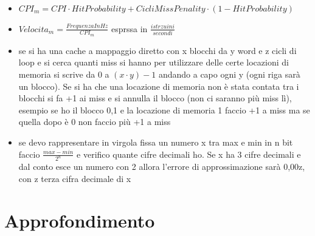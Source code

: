 \documentclass[a4paper,12pt, oneside]{book}
\begin{document}
\begin{itemize}
	\item $CPI_m=CPI\cdot HitProbability+CicliMissPenality\cdot (1-HitProbability)$
	\item $Velocita_m=\frac{FrequenzaInHz}{CPI_m}$ esprssa in $\frac{istrzuini}{secondi}$
	\item se si ha una cache a mappaggio diretto con x blocchi da y word e z cicli di loop e si cerca quanti miss si hanno per utilizzare delle certe locazioni di memoria si scrive da 0 a $(x\cdot y)-1$ andando a capo ogni y (ogni riga sarà un blocco). Se si ha che una locazione di memoria non è stata contata tra i blocchi si fa +1 ai miss e si annulla il blocco (non ci saranno più miss lì), esempio se ho il blocco 0,1 e la locazione di memoria 1 faccio +1 a miss ma se quella dopo è 0 non faccio più +1 a miss
	\item se devo rappresentare in virgola fissa un numero x tra max e min in n bit faccio $\frac{max-min}{2^n}$ e verifico quante cifre decimali ho. Se x ha 3 cifre decimali e dal conto esce un numero con 2 allora l'errore di approssimazione sarà 0,00z, con z terza cifra decimale di x

\end{itemize}
\chapter{Approfondimento}
\end{document}
